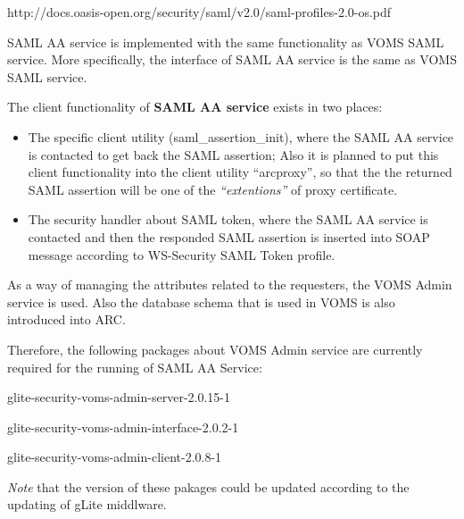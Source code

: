 \documentclass{article}                            %
\begin{document}
http://docs.oasis-open.org/security/saml/v2.0/saml-profiles-2.0-os.pdf

SAML AA service is implemented with the same functionality as VOMS SAML service. More specifically, the interface of SAML AA service is the same as VOMS SAML service.

The client functionality of \textbf{SAML AA service} exists in two places:

\begin{itemize}
    \item The specific client utility (saml\_assertion\_init), where the SAML AA service is contacted to get back the SAML assertion; Also it is planned to put this client functionality into the client utility ``arcproxy'', so that the the returned SAML assertion will be one of the \textit{``extentions''} of proxy certificate.

    \item The security handler about SAML token, where the SAML AA service is contacted and then the responded SAML assertion is inserted into SOAP message according to WS-Security SAML Token profile.

\end{itemize}

As a way of managing the attributes related to the requesters, the VOMS Admin service is used. Also the database schema that is used in VOMS is also introduced into ARC.

Therefore, the following packages about VOMS Admin service are currently required for the running of SAML AA Service:

glite-security-voms-admin-server-2.0.15-1

glite-security-voms-admin-interface-2.0.2-1

glite-security-voms-admin-client-2.0.8-1

\textit{Note} that the version of these pakages could be updated according to the updating of gLite middlware.

\begin{figure}[ht]
\end{figure}
\end{document}

